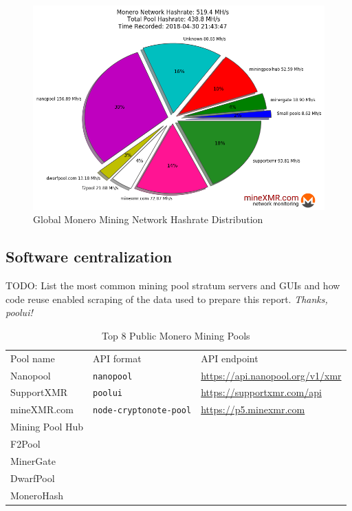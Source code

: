 \documentclass[notitlepage]{report}
\begin{document}
\begin{figure}[h]
\centering
\includegraphics[width=\textwidth]{global-monero-mining-network-hashrate-distribution-2018-04-30}
\captionsetup{labelformat=empty}
\caption{Global Monero Mining Network Hashrate Distribution}
\label{fig:hashrate-distribution}
\end{figure}

\subsection{Software centralization}

TODO: List the most common mining pool stratum servers and GUIs and how code reuse enabled scraping of the data used to prepare this report.  \textit{Thanks, poolui!}


\begin{table}[h]
\centering
\caption{Top 8 Public Monero Mining Pools}
\begin{tabular}{lll}
Pool name       & API format                  & API endpoint                          \\ 
Nanopool        & \verb/nanopool/             & \url{https://api.nanopool.org/v1/xmr} \\ 
SupportXMR      & \verb/poolui/               & \url{https://supportxmr.com/api}      \\ 
mineXMR.com     & \verb/node-cryptonote-pool/ & \url{https://p5.minexmr.com}          \\ 
Mining Pool Hub &                             &                                       \\
F2Pool          &                             &                                       \\
MinerGate       &                             &                                       \\
DwarfPool       &                             &                                       \\
MoneroHash      &                             &                                 
\end{tabular}
\label{table:top-8-pools}
\end{table}
\end{document}
